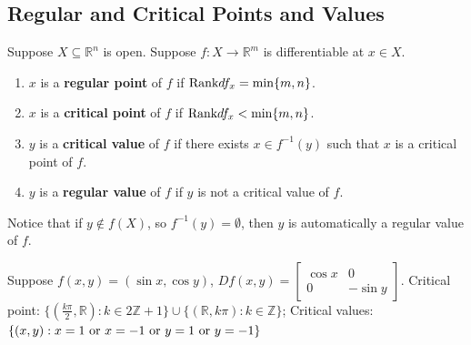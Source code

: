 \documentclass[11pt]{elegantbook}
\begin{document}
\subsection{Regular and Critical Points and Values}
\begin{definition}
    \normalfont
    Suppose $X \subseteq \mathbb{R}^n$ is open. Suppose $f : X \rightarrow \mathbb{R}^m$ is differentiable at $x \in X$.
    \begin{enumerate}
        \item $x$ is a \textbf{regular point} of $f$ if $\textnormal{Rank} df_x=\min\{m,n\}$.
        \item $x$ is a \textbf{critical point} of $f$ if $\textnormal{Rank} df_x<\min\{m,n\}$.
        \item $y$ is a \textbf{critical value} of $f$ if  there exists $x \in f^{-1}(y)$ such that $x$ is a critical point of $f$.
        \item $y$ is a \textbf{regular value} of $f$ if $y$ is not a critical value of $f$.
    \end{enumerate}
\end{definition}
\begin{note}
    Notice that if $y \notin f(X)$, so $f^{-1}(y) = \emptyset$, then $y$ is automatically a regular value of $f$.
\end{note}

\begin{example}
    Suppose $f(x,y)=(\sin x,\cos y)$, $Df(x,y)=\begin{bmatrix}
        \cos x&	0\\
        0&	-\sin y
    \end{bmatrix}$. Critical point: $\{(\frac{k\pi}{2}, \mathbb{R}): k\in 2\mathbb{Z}+1\}\cup\{(\mathbb{R},k\pi): k\in \mathbb{Z}\}$; Critical values: $\{(x,y): x=1\textnormal{ or }x=-1 \textnormal{ or }y=1\textnormal{ or }y=-1\}$
\end{example}
\end{document}
